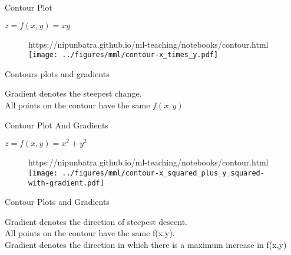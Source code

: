 \documentclass{beamer}
\begin{document}
\begin{frame}{Contour Plot}

$z = f(x,y) = xy$\\

\begin{figure}[htp]
	\centering
	\begin{notebookbox}{https://nipunbatra.github.io/ml-teaching/notebooks/contour.html}
	  \texttt{[image: ../figures/mml/contour-x\_times\_y.pdf]}
	\end{notebookbox}
  \end{figure}

\end{frame}









\begin{frame}{Contours plots and gradients}
    
    
    Gradient denotes the steepest change.\\
    All points on the contour have the same $f(x,y)$\\
    
    
\end{frame}

\begin{frame}{Contour Plot And Gradients}

$z = f(x,y) = x^{2} + y^{2}$\\

\begin{figure}[htp]
	\centering
	\begin{notebookbox}{https://nipunbatra.github.io/ml-teaching/notebooks/contour.html}
	  \texttt{[image: ../figures/mml/contour-x\_squared\_plus\_y\_squared-with-gradient.pdf]}
	\end{notebookbox}
  \end{figure}


\end{frame}








\begin{frame}{Contour Plots and Gradients}
    
    Gradient denotes the direction of steepest descent.\\
    All points on the contour have the same f(x,y).\\
    Gradient denotes the direction in which there is a maximum increase in f(x,y)\\

    
    
\end{frame}
\end{document}
